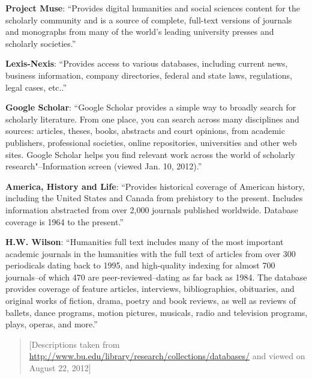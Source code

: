 \textbf{Project Muse}: ``Provides digital humanities and social sciences content for the scholarly community and is a source of complete, full-text versions of journals and monographs from many of the world's leading university presses and scholarly societies.''

\textbf{Lexis-Nexis}: ``Provides access to various databases, including current news, business information, company directories, federal and state laws, regulations, legal cases, etc..''

\textbf{Google Scholar}: ``Google Scholar provides a simple way to broadly search for scholarly literature. From one place, you can search across many disciplines and sources: articles, theses, books, abstracts and court opinions, from academic publishers, professional societies, online repositories, universities and other web sites. Google Scholar helps you find relevant work across the world of scholarly research"--Information screen (viewed Jan. 10, 2012).''

\textbf{America, History and Life}: ``Provides historical coverage of American history, including the United States and Canada from prehistory to the present. Includes information abstracted from over 2,000 journals published worldwide. Database coverage is 1964 to the present.''

\textbf{H.W. Wilson}: ``Humanities full text includes many of the most important academic journals in the humanities with the full text of articles from over 300 periodicals dating back to 1995, and high-quality indexing for almost 700 journals--of which 470 are peer-reviewed--dating as far back as 1984. The database provides coverage of feature articles, interviews, bibliographies, obituaries, and original works of fiction, drama, poetry and book reviews, as well as reviews of ballets, dance programs, motion pictures, musicals, radio and television programs, plays, operas, and more.''


\begin{quote}
[Descriptions taken from \url{http://www.bu.edu/library/research/collections/databases/} and viewed on August 22, 2012]
\end{quote}

